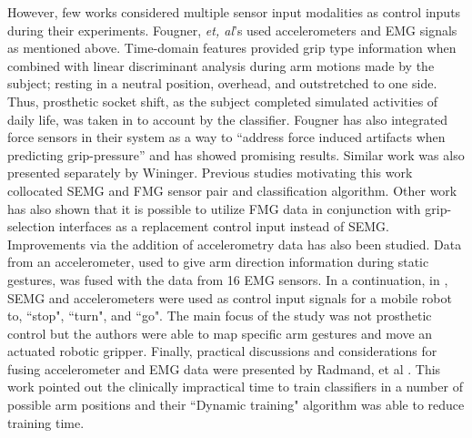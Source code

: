 \documentclass[twocolumn]{sagej}
\begin{document}
However, few works considered multiple sensor input modalities as control inputs during their experiments.  Fougner, \textit{et, al}'s used accelerometers and EMG signals as mentioned above.  Time-domain features provided grip type information when combined with linear discriminant analysis during arm motions made by the subject; resting in a neutral position, overhead, and outstretched to one side.\cite{Fougner2011}  Thus, prosthetic socket shift, as the subject completed simulated activities of daily life, was taken in to account by the classifier.  Fougner\cite{Fougner02008} has also integrated force sensors in their system as a way to ``address force induced artifacts when predicting grip-pressure'' and has showed promising results.  Similar work was also presented separately by Wininger\cite{Wininger02008}. Previous studies motivating this work collocated SEMG and FMG sensor pair and classification algorithm\cite{SanfordSPIE2015a}. Other work has also shown that it is possible to utilize FMG data in conjunction with grip-selection interfaces as a replacement control input instead of SEMG\cite{SanfordPETRA02015}.  Improvements via the addition of accelerometry data has also been studied. Data from an  accelerometer, used to give arm direction information during static gestures,  was fused with the data from 16 EMG sensors\cite{Assad2013}. In a continuation, in \cite{Wolf02013}, SEMG and accelerometers were used as control input signals for a mobile robot to, ``stop", ``turn", and ``go".  The main focus of the study was not prosthetic control but the authors were able to  map specific arm gestures and move an actuated robotic gripper\cite{Wolf02013}.  Finally, practical discussions and considerations for fusing accelerometer and EMG data were presented by Radmand, et al \cite{Radmand02014}.  This work pointed out the clinically impractical time to train classifiers in a number of possible arm positions and their ``Dynamic training" algorithm was able to reduce training time.\par \noindent
\end{document}
